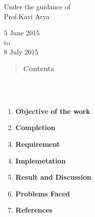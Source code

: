 \documentclass[report]{res}
\begin{document}
\begin{titlepage}
		{ Under the guidance of\\ \large{ Prof.Kavi Arya\\[3cm]}} %
		
		
		{\large 5 June 2015  \\ to \\ 8 July 2015}\\[3cm] %
		
		
		
		
		\vfill %
		
	\end{titlepage}
	
	
	\begin{quote}
		\centering \textbf{\Huge Contents} \\ 
	\end{quote}
	\qquad \\ \\
	\begin{enumerate}
		\item \textbf{\Large Objective of the work}
		\item \textbf{\Large Completion}
		\item \textbf{\Large Requirement}
		\item \textbf{\Large Implemetation}
		\item \textbf{\Large Result and Discussion}
		\item \textbf{\Large Problems Faced}
		\item \textbf{\Large References}
	\end{enumerate}
	
\end{document}
